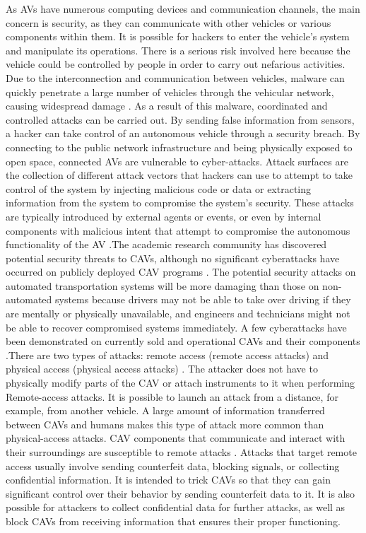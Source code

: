 \documentclass[a4paper,12pt]{article}
\begin{document}
\hspace{5mm} As AVs have numerous computing devices and communication channels, the main concern is security, as they can communicate with other vehicles or various components within them. It is possible for hackers to enter the vehicle's system and manipulate its operations. There is a serious risk involved here because the vehicle could be controlled by people in order to carry out nefarious activities. Due to the interconnection and communication between vehicles, malware can quickly penetrate a large number of vehicles through the vehicular network, causing widespread damage \cite{article21}. As a result of this malware, coordinated and controlled attacks can be carried out. By sending false information from sensors, a hacker can take control of an autonomous vehicle through a security breach. By connecting to the public network infrastructure and being physically exposed to open space, connected AVs are vulnerable to cyber-attacks. Attack surfaces are the collection of different attack vectors that hackers can use to attempt to take control of the system by injecting malicious code or data or extracting information from the system to compromise the system's security. These attacks are typically introduced by external agents or events, or even by internal components with malicious intent that attempt to compromise the autonomous functionality of the AV \cite{s7}.\newline The academic research community has discovered potential security threats to CAVs, although no significant cyberattacks have occurred on publicly deployed CAV programs \cite{article22}. The potential security attacks on automated transportation systems will be more damaging than those on non-automated systems because drivers may not be able to take over driving if they are mentally or physically unavailable, and engineers and technicians might not be able to recover compromised systems immediately. A few cyberattacks have been demonstrated on currently sold and operational CAVs and their components \cite{article22}.\newline There are two types of attacks: remote access (remote access attacks) and physical access (physical access attacks) \cite{article22}. The attacker does not have to physically modify parts of the CAV or attach instruments to it when performing Remote-access attacks. It is possible to launch an attack from a distance, for example, from another vehicle. A large amount of information transferred between CAVs and humans makes this type of attack more common than physical-access attacks. CAV components that communicate and interact with their surroundings are susceptible to remote attacks \cite{article22}. Attacks that target remote access usually involve sending counterfeit data, blocking signals, or collecting confidential information. It is intended to trick CAVs so that they can gain significant control over their behavior by sending counterfeit data to it. It is also possible for attackers to collect confidential data for further attacks, as well as block CAVs from receiving information that ensures their proper functioning.
\end{document}

